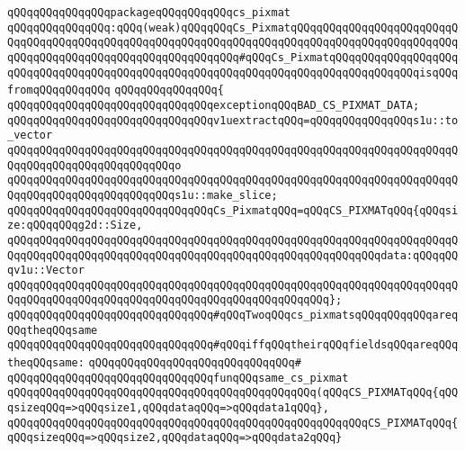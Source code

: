 \verb|qQQqqQQqqQQqqQQqpackageqQQqqQQqqQQqcs_pixmat|\newline
\verb|qQQqqQQqqQQqqQQq:qQQq(weak)qQQqqQQqCs_PixmatqQQqqQQqqQQqqQQqqQQqqQQqqQQqqQQqqQQqqQQqqQQqqQQqqQQqqQQqqQQqqQQqqQQqqQQqqQQqqQQqqQQqqQQqqQQqqQQqqQQqqQQqqQQqqQQqqQQqqQQqqQQqqQQqqQQq#qQQqCs_PixmatqQQqqQQqqQQqqQQqqQQqqQQqqQQqqQQqqQQqqQQqqQQqqQQqqQQqqQQqqQQqqQQqqQQqqQQqqQQqqQQqqQQqisqQQqfromqQQqqQQqqQQq|\newline
\verb|qQQqqQQqqQQqqQQq{|\newline
\verb|qQQqqQQqqQQqqQQqqQQqqQQqqQQqqQQqexceptionqQQqBAD_CS_PIXMAT_DATA;|\newline
\newline
\verb|qQQqqQQqqQQqqQQqqQQqqQQqqQQqqQQqv1uextractqQQq=qQQqqQQqqQQqqQQqs1u::to_vector|\newline
\verb|qQQqqQQqqQQqqQQqqQQqqQQqqQQqqQQqqQQqqQQqqQQqqQQqqQQqqQQqqQQqqQQqqQQqqQQqqQQqqQQqqQQqqQQqqQQqqQQqo|\newline
\verb|qQQqqQQqqQQqqQQqqQQqqQQqqQQqqQQqqQQqqQQqqQQqqQQqqQQqqQQqqQQqqQQqqQQqqQQqqQQqqQQqqQQqqQQqqQQqqQQqs1u::make_slice;|\newline
\newline
\verb|qQQqqQQqqQQqqQQqqQQqqQQqqQQqqQQqCs_PixmatqQQq=qQQqCS_PIXMATqQQq{qQQqsize:qQQqqQQqg2d::Size,|\newline
\verb|qQQqqQQqqQQqqQQqqQQqqQQqqQQqqQQqqQQqqQQqqQQqqQQqqQQqqQQqqQQqqQQqqQQqqQQqqQQqqQQqqQQqqQQqqQQqqQQqqQQqqQQqqQQqqQQqqQQqqQQqqQQqqQQqdata:qQQqqQQqv1u::Vector|\newline
\verb|qQQqqQQqqQQqqQQqqQQqqQQqqQQqqQQqqQQqqQQqqQQqqQQqqQQqqQQqqQQqqQQqqQQqqQQqqQQqqQQqqQQqqQQqqQQqqQQqqQQqqQQqqQQqqQQqqQQqqQQq};|\newline
\newline
\verb|qQQqqQQqqQQqqQQqqQQqqQQqqQQqqQQq#qQQqTwoqQQqcs_pixmatsqQQqqQQqqQQqareqQQqtheqQQqsame|\newline
\verb|qQQqqQQqqQQqqQQqqQQqqQQqqQQqqQQq#qQQqiffqQQqtheirqQQqfieldsqQQqareqQQqtheqQQqsame:|\newline
\verb|qQQqqQQqqQQqqQQqqQQqqQQqqQQqqQQq#|\newline
\verb|qQQqqQQqqQQqqQQqqQQqqQQqqQQqqQQqfunqQQqsame_cs_pixmat|\newline
\verb|qQQqqQQqqQQqqQQqqQQqqQQqqQQqqQQqqQQqqQQqqQQqqQQq(qQQqCS_PIXMATqQQq{qQQqsizeqQQq=>qQQqsize1,qQQqdataqQQq=>qQQqdata1qQQq},|\newline
\verb|qQQqqQQqqQQqqQQqqQQqqQQqqQQqqQQqqQQqqQQqqQQqqQQqqQQqqQQqCS_PIXMATqQQq{qQQqsizeqQQq=>qQQqsize2,qQQqdataqQQq=>qQQqdata2qQQq}|\newline
